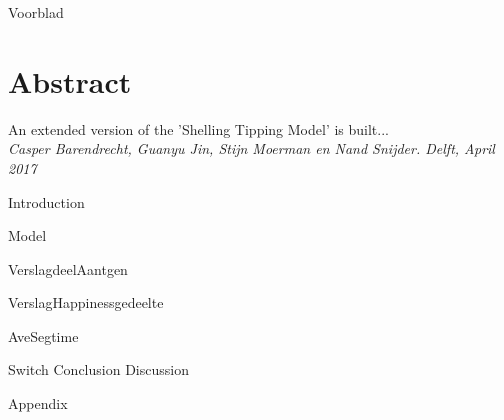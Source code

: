 \documentclass{article}
\begin{document}
{Voorblad}
\newpage


\section*{Abstract}
An extended version of the 'Shelling Tipping Model' is built...\\

\textit{Casper Barendrecht, Guanyu Jin, Stijn Moerman en Nand Snijder. Delft, April 2017}
\newpage

\tableofcontents
\newpage

{Introduction}
\newpage

{Model}
\newpage


\newpage

{VerslagdeelAantgen}
\newpage

{VerslagHappinessgedeelte}
\newpage

{AveSegtime}
\newpage

{Switch}
\newpage
{Conclusion}
\newpage
{Discussion}
\newpage
{}
{Appendix}
\newpage
\end{document}
